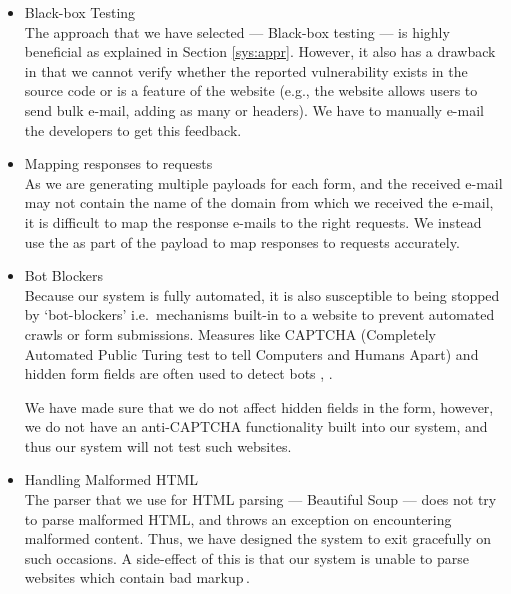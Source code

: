\begin{itemize}
	\item Black-box Testing\\
	The approach that we have selected --- Black-box testing --- is highly beneficial as explained in Section \ref{sys:appr}. However, it also has a drawback in that we cannot verify whether the reported vulnerability exists in the source code or is a feature of the website (e.g., the website allows users to send bulk e-mail, adding as many  or  headers). We have to manually e-mail the developers to get this feedback.
	
	\item Mapping responses to requests\\
	As we are generating multiple payloads for each form, and the received e-mail may not contain the name of the domain from which we received the e-mail, it is difficult to map the response e-mails to the right requests. We instead use the  as part of the payload to map responses to requests accurately.
	
	\item Bot Blockers\\
	\label{issues:captcha}
    Because our system is fully automated, it is also susceptible to being stopped by `bot-blockers' i.e.\ mechanisms built-in to a website to prevent automated crawls or form submissions. Measures like CAPTCHA (Completely Automated Public Turing test to tell Computers and Humans Apart) and hidden form fields are often used to detect bots \cite{captchas3}, \cite{captchas2}.
    
    We have made sure that we do not affect hidden fields in the form, however, we do not have an anti-CAPTCHA functionality built into our system, and thus our system will not test such websites.
    
	\item Handling Malformed HTML\\
    The parser that we use for HTML parsing --- Beautiful Soup --- does not try to parse malformed HTML, and throws an exception on encountering malformed content. Thus, we have designed the system to exit gracefully on such occasions. A side-effect of this is that our system is unable to parse websites which contain bad markup\,\footnotemark.
    
	

\end{itemize}
